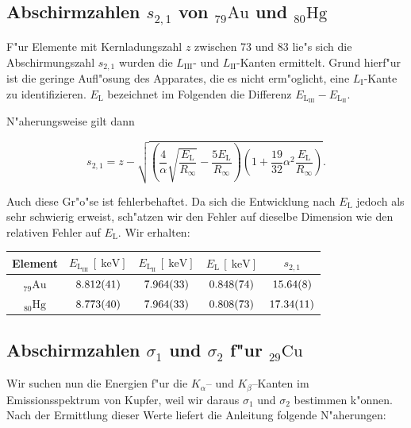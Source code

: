 	\subsection{Abschirmzahlen $s_{2,1}$ von ${}_{79}^{}\mathrm{Au}$ und ${}_{80}^{}\mathrm{Hg}$}
		\label{subsec:abschirm2}
		F"ur Elemente mit Kernladungszahl $z$ zwischen 73 und 83 lie"s sich die Abschirmungszahl $s_{2,1}$ wurden die $L_\mathrm{III}$- und $L_\mathrm{II}$-Kanten ermittelt.
		Grund hierf"ur ist die geringe Aufl"osung des Apparates, die es nicht erm"oglicht, eine $L_\mathrm{I}$-Kante zu identifizieren.
		$E_\mathrm{L}$ bezeichnet im Folgenden die Differenz $E_\mathrm{L_\mathrm{III}} - E_\mathrm{L_\mathrm{II}}$.
		
		N"aherungsweise gilt dann

		\begin{equation}
			s_{2,1} = z - \sqrt{\left( \frac{4}{\alpha} \sqrt{\frac{E_\mathrm{L}}{R_\infty}} - \frac{5 E_\mathrm{L}}{R_\infty} \right)
			\left( 1 + \frac{19}{32}\alpha^2 \frac{E_\mathrm{L}}{R_\infty} \right)}.
		\end{equation}

		Auch diese Gr"o"se ist fehlerbehaftet.
		Da sich die Entwicklung nach $E_\mathrm{L}$ jedoch als sehr schwierig erweist, sch"atzen wir den Fehler auf dieselbe Dimension wie den relativen Fehler auf $E_\mathrm{L}$. Wir erhalten:

		\begin{table}[h!]
			\centering
			\begin{tabular}{|c|c|c|c|c|}
				\hline
				Element & 
				$E_\mathrm{L_\mathrm{III}}\,[\SI{}{\kilo \electronvolt}]$ &
				$E_\mathrm{L_\mathrm{II}}\,[\SI{}{\kilo \electronvolt}]$ &
				$E_\mathrm{L}\,[\SI{}{\kilo \electronvolt}]$ & 
				$s_{2,1}$ \\
				\hline \hline
				${}_{79}^{}\mathrm{Au}$ & 
					$\SI{8.812 (41)}{}$ &
					$\SI{7.964 (33)}{}$ & 
					$\SI{.848 (74)}{}$ & 
					$\SI{15.64 (8)}{}$ \\
				${}_{80}^{}\mathrm{Hg}$ & 
					$\SI{8.773 (40)}{}$ &
					$\SI{7.964 (33)}{}$ &
					$\SI{.808 (73)}{}$ & 
					$\SI{17.34 (11)}{}$ \\
				\hline
			\end{tabular}
		\end{table}

	\subsection{Abschirmzahlen $\sigma_1$ und $\sigma_2$ f"ur ${}_{29}^{}\mathrm{Cu}$}
		\label{subsec:kupfer}
		Wir suchen nun die Energien f"ur die $K_\alpha$-- und $K_\beta$--Kanten im Emissionsspektrum von Kupfer, weil wir daraus $\sigma_1$ und $\sigma_2$ bestimmen k"onnen.
		Nach der Ermittlung dieser Werte liefert die Anleitung folgende N"aherungen:

